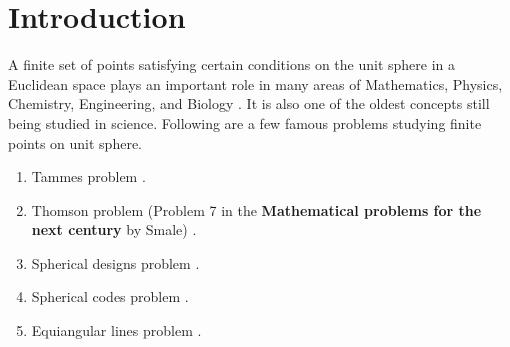 \documentclass{amsart}
\begin{document}
\section{Introduction}
A finite set of points satisfying certain conditions on the unit sphere in a Euclidean space plays an important role in many areas of Mathematics, Physics, Chemistry, Engineering, and Biology \cite{SAFFKUIJLAARS}. It is also one of the oldest concepts still being studied in science. Following are a few famous problems studying finite points on unit sphere.
\begin{enumerate}[\upshape(i)]
	\item Tammes problem \cite{CONWAYSLOANE}.
	\item Thomson problem (Problem 7 in the \textbf{Mathematical problems for the next century} by Smale) \cite{SMALE}.
	\item Spherical designs problem \cite{DELSARTEGOETHALSSEIDEL}.
	\item Spherical codes problem \cite{DELSARTEGOETHALSSEIDEL}.
	\item Equiangular lines problem \cite{LEMMENSSEIDEL}.
\end{enumerate}
\end{document}
